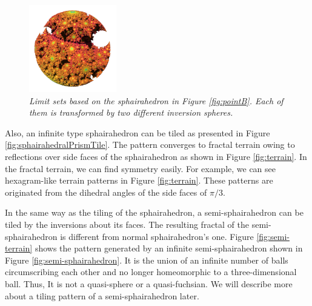 \begin{figure}[htbp]
\begin{minipage}[t]{0.5\textwidth}
\begin{minipage}[t]{0.24\textwidth}
  \end{minipage}
  \hspace*{\fill}
  \begin{minipage}[t]{0.24\textwidth}
   \centering
   \includegraphics[width=1.5in, height=1.5in,
   keepaspectratio]{./img/application/sphairahedron/derivation/conj2.png}
  \end{minipage}
  \hspace*{\fill}
  \caption{\textit{Limit sets based on the sphairahedron in Figure
  \ref{fig:pointB}.
  Each of them is transformed by two different inversion spheres.}}
  \label{fig:conjugation}
 \end{minipage}
\end{figure}

\noindent
Also, an infinite type sphairahedron can be tiled as presented in Figure
\ref{fig:sphairahedralPrismTile}.
The pattern converges to fractal terrain owing to reflections over side
faces of the sphairahedron as shown in Figure \ref{fig:terrain}.
In the fractal terrain, we can find symmetry easily.
For example, we can see hexagram-like terrain patterns in Figure
\ref{fig:terrain}.
These patterns are originated from the dihedral angles of the side faces of
$\pi / 3$.

In the same way as the tiling of the sphairahedron, a semi-sphairahedron
can be tiled by the inversions about its faces.
The resulting fractal of the semi-sphairahedron is different from normal
sphairahedron's one.
Figure \ref{fig:semi-terrain} shows the pattern
generated by an infinite semi-sphairahedron shown in Figure 
\ref{fig:semi-sphairahedron}.
It is the union of an infinite number of balls
circumscribing each other and no longer homeomorphic
to a three-dimensional ball.
Thus, It is not a quasi-sphere or a quasi-fuchsian.
We will describe more about a tiling pattern of a semi-sphairahedron later.

